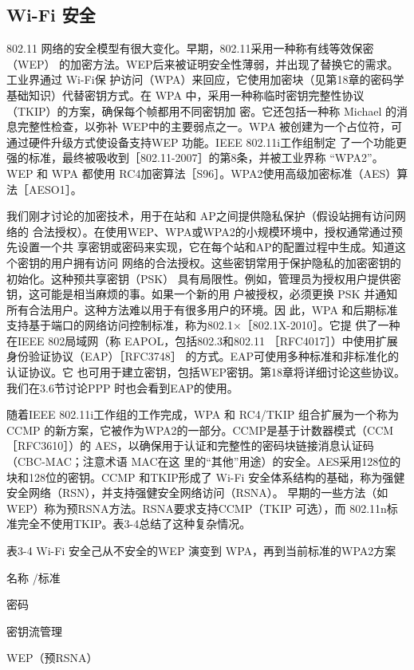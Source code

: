 \subsection{Wi-Fi 安全}

802.11 网络的安全模型有很大变化。早期，802.11采用一种称有线等效保密（WEP）
的加密方法。WEP后来被证明安全性薄弱，并出现了替换它的需求。工业界通过 Wi-Fi保
护访问（WPA）来回应，它使用加密块（见第18章的密码学基础知识）代替密钥方式。在
WPA 中，采用一种称临时密钥完整性协议（TKIP）的方案，确保每个帧都用不同密钥加
密。它还包括一种称 Michael 的消息完整性检查，以弥补 WEP中的主要弱点之一。WPA
被创建为一个占位符，可通过硬件升级方式使设备支持WEP 功能。IEEE 802.11i工作组制定
了一个功能更强的标准，最终被吸收到［802.11-2007］的第8条，并被工业界称 “WPA2”。
WEP 和 WPA 都使用 RC4加密算法［S96］。WPA2使用高级加密标准（AES）算法［AESO1］。

我们刚才讨论的加密技术，用于在站和 AP之间提供隐私保护（假设站拥有访问网络的
合法授权）。在使用WEP、WPA或WPA2的小规模环境中，授权通常通过预先设置一个共
享密钥或密码来实现，它在每个站和AP的配置过程中生成。知道这个密钥的用户拥有访问
网络的合法授权。这些密钥常用于保护隐私的加密密钥的初始化。这种预共享密钥（PSK）
具有局限性。例如，管理员为授权用户提供密钥，这可能是相当麻烦的事。如果一个新的用
户被授权，必须更换 PSK 并通知所有合法用户。这种方法难以用于有很多用户的环境。因
此，WPA 和后期标准支持基于端口的网络访问控制标准，称为802.1×［802.1X-2010］。它提
供了一种在IEEE 802局域网（称 EAPOL，包括802.3和802.11 ［RFC4017］）中使用扩展
身份验证协议（EAP）［RFC3748］ 的方式。EAP可使用多种标准和非标准化的认证协议。它
也可用于建立密钥，包括WEP密钥。第18章将详细讨论这些协议。我们在3.6节讨论PPP
时也会看到EAP的使用。

随着IEEE 802.11i工作组的工作完成，WPA 和 RC4/TKIP 组合扩展为一个称为CCMP
的新方案，它被作为WPA2的一部分。CCMP是基于计数器模式（CCM［RFC3610］）的
AES，以确保用于认证和完整性的密码块链接消息认证码（CBC-MAC；注意术语 MAC在这
里的“其他”用途）的安全。AES采用128位的块和128位的密钥。CCMP 和TKIP形成了
Wi-Fi 安全体系结构的基础，称为强健安全网络（RSN），并支持强健安全网络访问（RSNA）。
早期的一些方法（如WEP）称为预RSNA方法。RSNA要求支持CCMP（TKIP 可选），而
802.11n标准完全不使用TKIP。表3-4总结了这种复杂情况。

表3-4 Wi-Fi 安全己从不安全的WEP 演变到 WPA，再到当前标准的WPA2方案

名称 /标准

密码

密钥流管理

WEP（预RSNA）

